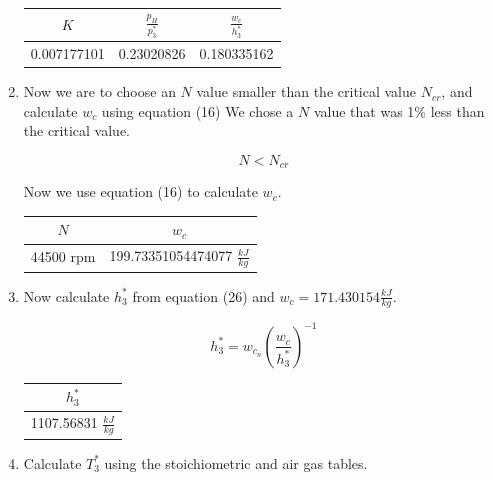 \documentclass[titlepage]{article}
\begin{document}
\begin{enumerate}
    \begin{center}
      \begin{tabular}{|c|c|c|}
        \hline
        $K$ & $\frac{p_{H}}{p_{3}^{*}}$ & $\frac{w_{c}}{h_{3}^{*}}$ \\
        \hline
        0.007177101 & 0.23020826 & 0.180335162\\
        \hline
      \end{tabular}
    \end{center}
  
    \item Now we are to choose an $N$ value smaller than the critical value $N_{cr}$, and calculate $w_{c}$ using equation (16)
    We chose a $N$ value that was 1\% less than the critical value.
  
    \begin{equation}
      N < N_{cr}
    \end{equation}
  
    Now we use equation (16) to calculate $w_{c}$. 
  
    \begin{center}
      \begin{tabular}{|c|c|}
        \hline
        $N$ & $w_{c}$ \\
        \hline
        44500 rpm & 199.73351054474077 $\frac{kJ}{kg}$ \\
        \hline
      \end{tabular}
    \end{center}
  
    \item Now calculate $h_{3}^{*}$ from equation (26) and $w_{c} = 171.430154 \frac{kJ}{kg}$.
    
    \begin{equation}
      h_{3}^{*} = w_{c_{n}} \left( \frac{w_{c}}{h_{3}^{*}}\right)^{-1}
    \end{equation}
  
    \begin{center}
      \begin{tabular}{|c|}
        \hline
        $h_{3}^{*}$ \\
        \hline
        1107.56831 $\frac{kJ}{kg}$ \\
        \hline
      \end{tabular}
    \end{center}
  
    \item Calculate $T_{3}^{*}$ using the stoichiometric and air gas tables. 
    

\end{enumerate}
\end{document}
